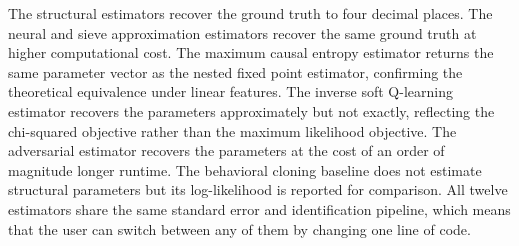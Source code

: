 The structural estimators recover the ground truth to four decimal places. The neural and sieve approximation estimators recover the same ground truth at higher computational cost. The maximum causal entropy estimator returns the same parameter vector as the nested fixed point estimator, confirming the theoretical equivalence under linear features. The inverse soft Q-learning estimator recovers the parameters approximately but not exactly, reflecting the chi-squared objective rather than the maximum likelihood objective. The adversarial estimator recovers the parameters at the cost of an order of magnitude longer runtime. The behavioral cloning baseline does not estimate structural parameters but its log-likelihood is reported for comparison. All twelve estimators share the same standard error and identification pipeline, which means that the user can switch between any of them by changing one line of code.
